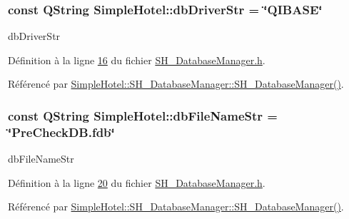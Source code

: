\hypertarget{namespaceSimpleHotel_a0cb9ef00bd18f8e9d5e7087865dc1cc3}{
\subsubsection[{db\-Driver\-Str}]{\setlength{\rightskip}{0pt plus 5cm}const Q\-String Simple\-Hotel\-::db\-Driver\-Str = \char`\"{}Q\-I\-B\-A\-S\-E\char`\"{}\hspace{0.3cm}{\ttfamily [static]}}}\label{namespaceSimpleHotel_a0cb9ef00bd18f8e9d5e7087865dc1cc3}


db\-Driver\-Str 



Définition à la ligne \hyperlink{SH__DatabaseManager_8h_source_l00016}{16} du fichier \hyperlink{SH__DatabaseManager_8h_source}{S\-H\-\_\-\-Database\-Manager.\-h}.



Référencé par \hyperlink{classSimpleHotel_1_1SH__DatabaseManager_ade00a085fdf7207d67476179e179d03d}{Simple\-Hotel\-::\-S\-H\-\_\-\-Database\-Manager\-::\-S\-H\-\_\-\-Database\-Manager()}.

\hypertarget{namespaceSimpleHotel_af1f81c1910383e17a678eb42e0bbcf69}{
\subsubsection[{db\-File\-Name\-Str}]{\setlength{\rightskip}{0pt plus 5cm}const Q\-String Simple\-Hotel\-::db\-File\-Name\-Str = \char`\"{}Pre\-Check\-D\-B.\-fdb\char`\"{}\hspace{0.3cm}{\ttfamily [static]}}}\label{namespaceSimpleHotel_af1f81c1910383e17a678eb42e0bbcf69}


db\-File\-Name\-Str 



Définition à la ligne \hyperlink{SH__DatabaseManager_8h_source_l00020}{20} du fichier \hyperlink{SH__DatabaseManager_8h_source}{S\-H\-\_\-\-Database\-Manager.\-h}.



Référencé par \hyperlink{classSimpleHotel_1_1SH__DatabaseManager_ade00a085fdf7207d67476179e179d03d}{Simple\-Hotel\-::\-S\-H\-\_\-\-Database\-Manager\-::\-S\-H\-\_\-\-Database\-Manager()}.

